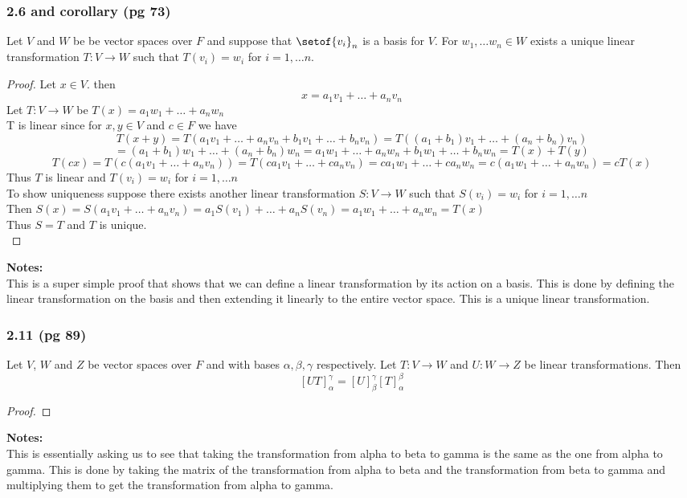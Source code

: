 \documentclass[answers,12pt,addpoints]{exam}
\begin{document}
\subsubsection{2.6 and corollary (pg 73)}
Let $V$ and $W$ be be vector spaces over $F$ and suppose that $\setof{v_i}_n$ is a basis for $V$. For $w_1, \dots w_n \in W$ exists a unique linear transformation $T: V \to W$ such that $T(v_i) = w_i$ for $i = 1, \dots n$.\\
\begin{proof}
    Let $x \in V$. then 
    $$x = a_1v_1 + \dots + a_nv_n$$
    Let $T: V \to W$ be $T(x) = a_1w_1 + \dots + a_nw_n$\\
    T is linear since for $x,y \in V$ and $c \in F$ we have
    $$T(x+y) = T(a_1v_1 + \dots + a_nv_n + b_1v_1 + \dots + b_nv_n) = T((a_1+b_1)v_1 + \dots + (a_n+b_n)v_n)$$ $$= (a_1+b_1)w_1 + \dots + (a_n+b_n)w_n = a_1w_1 + \dots + a_nw_n + b_1w_1 + \dots + b_nw_n = T(x) + T(y)$$
    $$T(cx) = T(c(a_1v_1 + \dots + a_nv_n)) = T(ca_1v_1 + \dots + ca_nv_n) = ca_1w_1 + \dots + ca_nw_n = c(a_1w_1 + \dots + a_nw_n) = cT(x)$$
    Thus $T$ is linear and $T(v_i) = w_i$ for $i = 1, \dots n$\\
    To show uniqueness suppose there exists another linear transformation $S: V \to W$ such that $S(v_i) = w_i$ for $i = 1, \dots n$\\
    Then $S(x) = S(a_1v_1 + \dots + a_nv_n) = a_1S(v_1) + \dots + a_nS(v_n) = a_1w_1 + \dots + a_nw_n = T(x)$\\
    Thus $S = T$ and $T$ is unique.\\
\end{proof}
\textbf{Notes:}\\
This is a super simple proof that shows that we can define a linear transformation by its action on a basis. This is done by defining the linear transformation on the basis and then extending it linearly to the entire vector space. This is a unique linear transformation.\\

\subsubsection{2.11 (pg 89)}
Let $V$, $W$ and $Z$ be vector spaces over $F$ and with bases $\alpha, \beta, \gamma$ respectively. Let $T: V \to W$ and $U: W \to Z$ be linear transformations. Then
$$ [UT]_{\alpha}^{\gamma} = [U]_{\beta}^{\gamma}[T]_{\alpha}^{\beta}$$
\begin{proof}
    
\end{proof}
\textbf{Notes:}\\
This is essentially asking us to see that taking the transformation from alpha to beta to gamma is the same as the one from alpha to gamma. This is done by taking the matrix of the transformation from alpha to beta and the transformation from beta to gamma and multiplying them to get the transformation from alpha to gamma.\\
\end{document}
